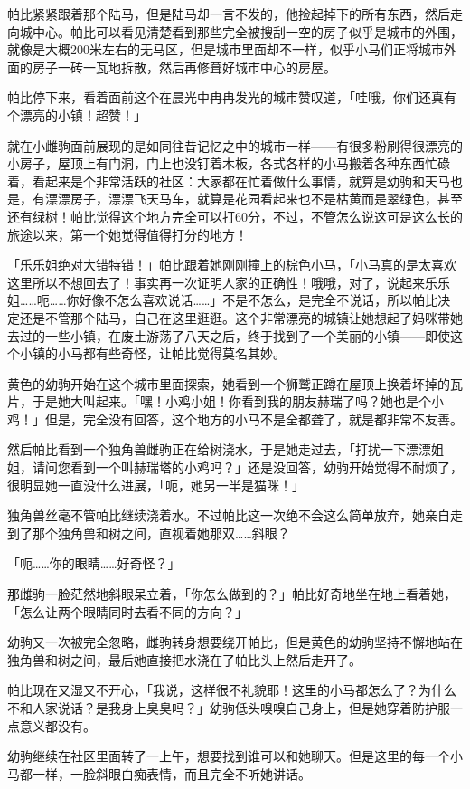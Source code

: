 帕比紧紧跟着那个陆马，但是陆马却一言不发的，他捡起掉下的所有东西，然后走向城中心。帕比可以看见清楚看到那些完全被搜刮一空的房子似乎是城市的外围，就像是大概200米左右的无马区，但是城市里面却不一样，似乎小马们正将城市外面的房子一砖一瓦地拆散，然后再修葺好城市中心的房屋。

帕比停下来，看着面前这个在晨光中冉冉发光的城市赞叹道，「哇哦，你们还真有个漂亮的小镇！超赞！」

就在小雌驹面前展现的是如同往昔记忆之中的城市一样——有很多粉刷得很漂亮的小房子，屋顶上有门洞，门上也没钉着木板，各式各样的小马搬着各种东西忙碌着，看起来是个非常活跃的社区：大家都在忙着做什么事情，就算是幼驹和天马也是，有漂漂房子，漂漂飞天马车，就算是花园看起来也不是枯黄而是翠绿色，甚至还有绿树！帕比觉得这个地方完全可以打60分，不过，不管怎么说这可是这么长的旅途以来，第一个她觉得值得打分的地方！

「乐乐姐绝对大错特错！」帕比跟着她刚刚撞上的棕色小马，「小马真的是太喜欢这里所以不想回去了！事实再一次证明人家的正确性！哦哦，对了，说起来乐乐姐……呃……你好像不怎么喜欢说话……」不是不怎么，是完全不说话，所以帕比决定还是不管那个陆马，自己在这里逛逛。这个非常漂亮的城镇让她想起了妈咪带她去过的一些小镇，在废土游荡了八天之后，终于找到了一个美丽的小镇——即使这个小镇的小马都有些奇怪，让帕比觉得莫名其妙。

黄色的幼驹开始在这个城市里面探索，她看到一个狮鹫正蹲在屋顶上换着坏掉的瓦片，于是她大叫起来。「嘿！小鸡小姐！你看到我的朋友赫瑞了吗？她也是个小鸡！」但是，完全没有回答，这个地方的小马不是全都聋了，就是都非常不友善。

然后帕比看到一个独角兽雌驹正在给树浇水，于是她走过去，「打扰一下漂漂姐姐，请问您看到一个叫赫瑞塔的小鸡吗？」还是没回答，幼驹开始觉得不耐烦了，很明显她一直没什么进展，「呃，她另一半是猫咪！」

独角兽丝毫不管帕比继续浇着水。不过帕比这一次绝不会这么简单放弃，她亲自走到了那个独角兽和树之间，直视着她那双……斜眼？

「呃……你的眼睛……好奇怪？」

那雌驹一脸茫然地斜眼呆立着，「你怎么做到的？」帕比好奇地坐在地上看着她，「怎么让两个眼睛同时去看不同的方向？」

幼驹又一次被完全忽略，雌驹转身想要绕开帕比，但是黄色的幼驹坚持不懈地站在独角兽和树之间，最后她直接把水浇在了帕比头上然后走开了。

帕比现在又湿又不开心，「我说，这样很不礼貌耶！这里的小马都怎么了？为什么不和人家说话？是我身上臭臭吗？」幼驹低头嗅嗅自己身上，但是她穿着防护服一点意义都没有。

幼驹继续在社区里面转了一上午，想要找到谁可以和她聊天。但是这里的每一个小马都一样，一脸斜眼白痴表情，而且完全不听她讲话。


